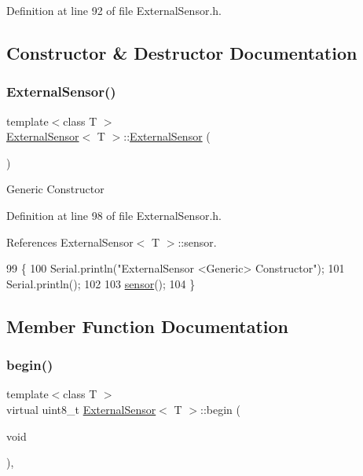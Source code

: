 Definition at line 92 of file External\+Sensor.\+h.



\subsection{Constructor \& Destructor Documentation}
\mbox{\label{classExternalSensor_a8b991447fba33253103d06198b838751}} 
\subsubsection{\texorpdfstring{External\+Sensor()}{ExternalSensor()}}
{\footnotesize\ttfamily template$<$class T $>$ \\
\hyperlink{classExternalSensor}{External\+Sensor}$<$ T $>$\+::\hyperlink{classExternalSensor}{External\+Sensor} (\begin{DoxyParamCaption}{ }\end{DoxyParamCaption})\hspace{0.3cm}{\ttfamily [inline]}}

Generic Constructor 

Definition at line 98 of file External\+Sensor.\+h.



References External\+Sensor$<$ T $>$\+::sensor.


\begin{DoxyCode}
99     \{
100         Serial.println(\textcolor{stringliteral}{"ExternalSensor <Generic> Constructor"});
101         Serial.println();
102 
103         \hyperlink{classExternalSensor_a6e1f518119abe08c14b498ce24a7e1b3}{sensor}();
104     \}
\end{DoxyCode}


\subsection{Member Function Documentation}
\mbox{\label{classExternalSensor_ab6fe1379d55b656a048e0fba1e0a32e6}} 
\subsubsection{\texorpdfstring{begin()}{begin()}}
{\footnotesize\ttfamily template$<$class T $>$ \\
virtual uint8\+\_\+t \hyperlink{classExternalSensor}{External\+Sensor}$<$ T $>$\+::begin (\begin{DoxyParamCaption}\item[{void}]{ }\end{DoxyParamCaption})\hspace{0.3cm}{\ttfamily [inline]}, {\ttfamily [virtual]}}

